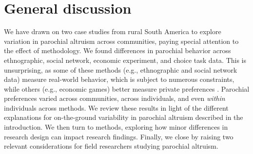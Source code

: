 \documentclass[bibauthoryear]{aa}
\begin{document}
\section{General discussion}

We have drawn on two case studies from rural South America to explore variation in parochial altruism across communities, paying special attention to the effect of methodology.  We found differences in parochial behavior across ethnographic, social network, economic experiment, and choice task data. This is unsurprising, as some of these methods (e.g., ethnographic and social network data) measure real-world behavior, which is subject to numerous constraints, while others (e.g.,  economic games) better measure private preferences \citep{Pisor2020}. Parochial preferences varied across communities, across individuals, and even \emph{within} individuals across methods. We review these results in light of the different explanations for on-the-ground variability in parochial altruism described in the introduction. We then turn to methods, exploring how minor differences in research design can impact research findings. Finally, we close by raising two relevant considerations for field researchers studying parochial altruism.
\end{document}
